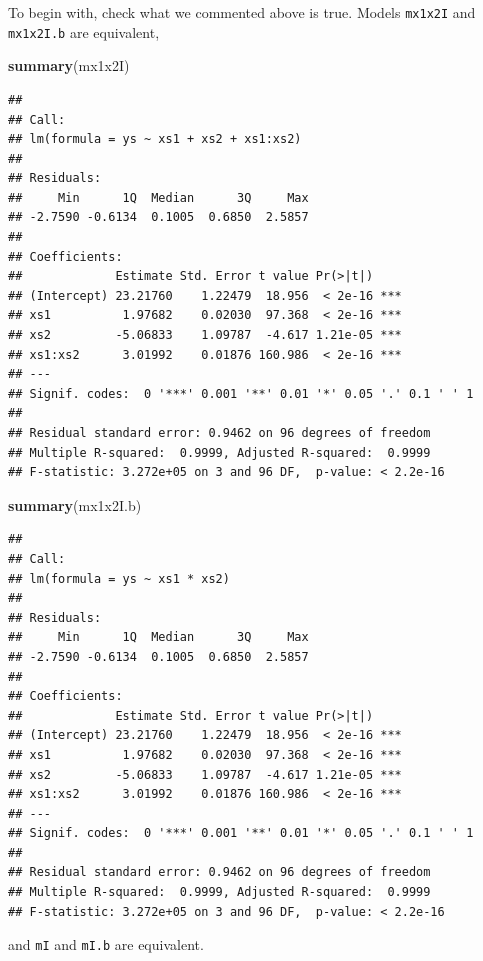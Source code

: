 \documentclass[
]{book}
\newenvironment{Shaded}{\begin{snugshade}}{\end{snugshade}}
\newcommand{\FunctionTok}[1]{\textcolor[rgb]{0.13,0.29,0.53}{\textbf{#1}}}
\newcommand{\NormalTok}[1]{#1}
\begin{document}
To begin with, check what we commented above is true. Models \texttt{mx1x2I} and \texttt{mx1x2I.b} are equivalent,

\begin{Shaded}
\begin{Highlighting}[]
\FunctionTok{summary}\NormalTok{(mx1x2I)}
\end{Highlighting}
\end{Shaded}

\begin{verbatim}
## 
## Call:
## lm(formula = ys ~ xs1 + xs2 + xs1:xs2)
## 
## Residuals:
##     Min      1Q  Median      3Q     Max 
## -2.7590 -0.6134  0.1005  0.6850  2.5857 
## 
## Coefficients:
##             Estimate Std. Error t value Pr(>|t|)    
## (Intercept) 23.21760    1.22479  18.956  < 2e-16 ***
## xs1          1.97682    0.02030  97.368  < 2e-16 ***
## xs2         -5.06833    1.09787  -4.617 1.21e-05 ***
## xs1:xs2      3.01992    0.01876 160.986  < 2e-16 ***
## ---
## Signif. codes:  0 '***' 0.001 '**' 0.01 '*' 0.05 '.' 0.1 ' ' 1
## 
## Residual standard error: 0.9462 on 96 degrees of freedom
## Multiple R-squared:  0.9999, Adjusted R-squared:  0.9999 
## F-statistic: 3.272e+05 on 3 and 96 DF,  p-value: < 2.2e-16
\end{verbatim}

\begin{Shaded}
\begin{Highlighting}[]
\FunctionTok{summary}\NormalTok{(mx1x2I.b)}
\end{Highlighting}
\end{Shaded}

\begin{verbatim}
## 
## Call:
## lm(formula = ys ~ xs1 * xs2)
## 
## Residuals:
##     Min      1Q  Median      3Q     Max 
## -2.7590 -0.6134  0.1005  0.6850  2.5857 
## 
## Coefficients:
##             Estimate Std. Error t value Pr(>|t|)    
## (Intercept) 23.21760    1.22479  18.956  < 2e-16 ***
## xs1          1.97682    0.02030  97.368  < 2e-16 ***
## xs2         -5.06833    1.09787  -4.617 1.21e-05 ***
## xs1:xs2      3.01992    0.01876 160.986  < 2e-16 ***
## ---
## Signif. codes:  0 '***' 0.001 '**' 0.01 '*' 0.05 '.' 0.1 ' ' 1
## 
## Residual standard error: 0.9462 on 96 degrees of freedom
## Multiple R-squared:  0.9999, Adjusted R-squared:  0.9999 
## F-statistic: 3.272e+05 on 3 and 96 DF,  p-value: < 2.2e-16
\end{verbatim}

and \texttt{mI} and \texttt{mI.b} are equivalent.
\end{document}
